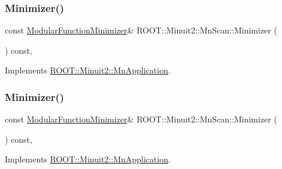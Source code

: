 \subsubsection{\texorpdfstring{Minimizer()}{Minimizer()}\hspace{0.1cm}{\footnotesize\ttfamily [2/3]}}
{\footnotesize\ttfamily const \mbox{\hyperlink{classROOT_1_1Minuit2_1_1ModularFunctionMinimizer}{Modular\+Function\+Minimizer}}\& R\+O\+O\+T\+::\+Minuit2\+::\+Mn\+Scan\+::\+Minimizer (\begin{DoxyParamCaption}{ }\end{DoxyParamCaption}) const\hspace{0.3cm}{\ttfamily [inline]}, {\ttfamily [virtual]}}



Implements \mbox{\hyperlink{classROOT_1_1Minuit2_1_1MnApplication_a5a8e1e2658b731b5f4023dd1b1594223}{R\+O\+O\+T\+::\+Minuit2\+::\+Mn\+Application}}.

\mbox{\label{classROOT_1_1Minuit2_1_1MnScan_a9bebaf56360ff70aac6f47590227d8b5}} 
\subsubsection{\texorpdfstring{Minimizer()}{Minimizer()}\hspace{0.1cm}{\footnotesize\ttfamily [3/3]}}
{\footnotesize\ttfamily const \mbox{\hyperlink{classROOT_1_1Minuit2_1_1ModularFunctionMinimizer}{Modular\+Function\+Minimizer}}\& R\+O\+O\+T\+::\+Minuit2\+::\+Mn\+Scan\+::\+Minimizer (\begin{DoxyParamCaption}{ }\end{DoxyParamCaption}) const\hspace{0.3cm}{\ttfamily [inline]}, {\ttfamily [virtual]}}



Implements \mbox{\hyperlink{classROOT_1_1Minuit2_1_1MnApplication_a5a8e1e2658b731b5f4023dd1b1594223}{R\+O\+O\+T\+::\+Minuit2\+::\+Mn\+Application}}.

\mbox{\label{classROOT_1_1Minuit2_1_1MnScan_aaad559ec656a90df6e3283885ff2e7ca}} 
